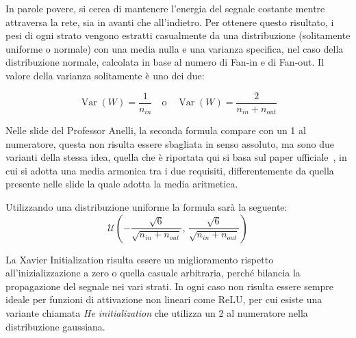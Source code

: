 In parole povere, si cerca di mantenere l'energia del segnale costante mentre attraversa la rete, sia in avanti che all'indietro. Per ottenere questo risultato, i pesi di ogni strato vengono estratti casualmente da una distribuzione (solitamente uniforme o normale) con una media nulla e una varianza specifica, nel caso della distribuzione normale, calcolata in base al numero di Fan-in e di Fan-out. Il valore della varianza solitamente è uno dei due:

\begin{equation}
    \operatorname{Var}(W) = \frac{1}{n_{in}}\quad \text{o}\quad \operatorname{Var}(W)= \frac{2}{n_{in}+n_{out}}
\end{equation}

\begin{Osservazione}
    Nelle slide del Professor Anelli, la seconda formula compare con un 1 al numeratore, questa non risulta essere sbagliata in senso assoluto, ma sono due varianti della stessa idea, quella che è riportata qui si basa sul paper ufficiale~\cite{glorot2010understanding}, in cui si adotta una media armonica tra i due requisiti, differentemente da quella presente nelle slide la quale adotta la media aritmetica.
\end{Osservazione}

Utilizzando una distribuzione uniforme la formula sarà la seguente:
\begin{equation}
    \mathcal{U}\left(-\frac{\sqrt{6}}{\sqrt{n_{in}+n_{out}}},\,\frac{\sqrt{6}}{\sqrt{n_{in}+n_{out}}}\right)
\end{equation}

La Xavier Initialization risulta essere un miglioramento rispetto all'inizializzazione a zero o quella casuale arbitraria, perché bilancia la propagazione del segnale nei vari strati. In ogni caso non risulta essere sempre ideale per funzioni di attivazione non lineari come ReLU, per cui esiste una variante chiamata \textit{He initialization} che utilizza un 2 al numeratore nella distribuzione gaussiana.

